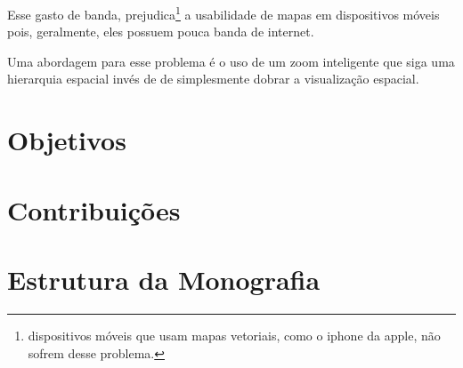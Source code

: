 Esse gasto de banda, prejudica\footnote{dispositivos móveis que usam mapas vetoriais, como o iphone da apple, não sofrem desse problema.} a usabilidade de mapas em dispositivos móveis pois, geralmente, eles possuem pouca banda de internet.

Uma abordagem para esse problema é o uso de um zoom inteligente que siga uma hierarquia espacial invés de de simplesmente dobrar a visualização espacial. 
 





\section{Objetivos}

\section{Contribuições}

\section{Estrutura da Monografia}
